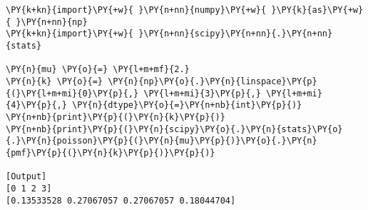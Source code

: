 \begin{Verbatim}[label=\makebox{\href{https://github.com/unipi-physics-labs/lab1-notes/tree/main/snippy/scipy.stats.poisson.py}{https://github.com/.../scipy.stats.poisson.py}},commandchars=\\\{\}]
\PY{k+kn}{import}\PY{+w}{ }\PY{n+nn}{numpy}\PY{+w}{ }\PY{k}{as}\PY{+w}{ }\PY{n+nn}{np}
\PY{k+kn}{import}\PY{+w}{ }\PY{n+nn}{scipy}\PY{n+nn}{.}\PY{n+nn}{stats}

\PY{n}{mu} \PY{o}{=} \PY{l+m+mf}{2.}
\PY{n}{k} \PY{o}{=} \PY{n}{np}\PY{o}{.}\PY{n}{linspace}\PY{p}{(}\PY{l+m+mi}{0}\PY{p}{,} \PY{l+m+mi}{3}\PY{p}{,} \PY{l+m+mi}{4}\PY{p}{,} \PY{n}{dtype}\PY{o}{=}\PY{n+nb}{int}\PY{p}{)}
\PY{n+nb}{print}\PY{p}{(}\PY{n}{k}\PY{p}{)}
\PY{n+nb}{print}\PY{p}{(}\PY{n}{scipy}\PY{o}{.}\PY{n}{stats}\PY{o}{.}\PY{n}{poisson}\PY{p}{(}\PY{n}{mu}\PY{p}{)}\PY{o}{.}\PY{n}{pmf}\PY{p}{(}\PY{n}{k}\PY{p}{)}\PY{p}{)}

[Output]
[0 1 2 3]
[0.13533528 0.27067057 0.27067057 0.18044704]
\end{Verbatim}
